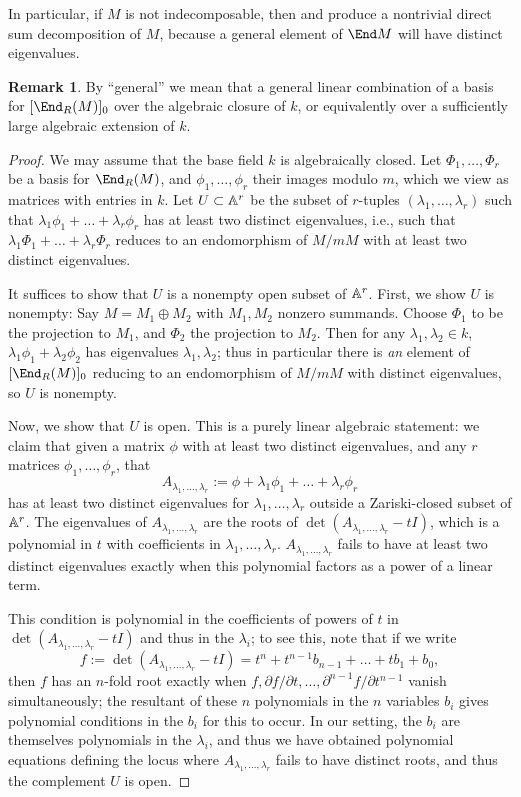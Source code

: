 \documentclass[12pt]{article}
\let\l\lambda
\let\d\partial
\theoremstyle{theorem}
\numberwithin{thm}{section}
\theoremstyle{definition}
\newtheorem{rem}[thm]{Remark}
\begin{document}
In particular, if $M$ is not indecomposable, then  and  produce a nontrivial direct sum decomposition of $M$, because a general element of $\End M$ will have distinct eigenvalues.

\begin{rem}
  By ``general'' we mean that a general linear combination of a basis for $[\End_R(M)]_0$ over the algebraic closure of $k$, or equivalently over a sufficiently large algebraic extension of $k$.
\end{rem}

\begin{proof}
  We may assume that the base field $k$ is algebraically closed.
  Let $\Phi_1,\dots,\Phi_r$ be a basis for $\End_R(M)$, and $\phi_1,\dots,\phi_r$ their images modulo $m$, which we view as matrices with entries in $k$.
  Let $U\subset \mathbb A^r$ be the subset of $r$-tuples $(\l_1,\dots,\l_r)$ such that $\l_1\phi_1+\dots+\l_r\phi_r$ has at least two distinct eigenvalues, i.e., such that $\l_1\Phi_1+\dots+\l_r\Phi_r$ reduces to an endomorphism of $M/mM$ with at least two distinct eigenvalues.

  It suffices to show that $U$ is a nonempty open subset of $\mathbb A^r$. First, we show $U$ is nonempty:
  Say $M=M_1\oplus M_2$ with $M_1,M_2$  nonzero  summands. Choose $\Phi_1$ to be the projection to $M_1$, and $\Phi_2$ the projection to $M_2$. Then for any $\l_1,\l_2\in k$, $\l_1\phi_1 + \l_2\phi_2$ has eigenvalues $\l_1,\l_2$; thus in particular there is \emph{an} element of $[\End_R(M)]_0$ reducing to an endomorphism of $M/mM$ with distinct eigenvalues, so $U$ is nonempty.

  Now, we show that $U$ is open. This is a purely linear algebraic statement: we claim that given a matrix $\phi$ with at least two distinct eigenvalues, and any $r$ matrices $\phi_1,\dots,\phi_r$, that
  $$ A_{\l_1,\dots,\l_r}:=\phi+\l_1\phi_1+\dots+\l_r\phi_r $$
  has at least two distinct eigenvalues for $\l_1,\dots,\l_r$ outside a Zariski-closed subset of $\mathbb A^r$.
  The eigenvalues of $A_{\l_1,\dots,\l_r}$ are the roots of $\det(A_{\l_1,\dots,\l_r}-t I)$, which is a polynomial in $t$ with coefficients in $\l_1,\dots,\l_r$.
$A_{\l_1,\dots,\l_r}$ fails to have at least two distinct eigenvalues exactly when this polynomial factors as a power of a linear term.

This condition is polynomial in the coefficients of powers of $t$ in $\det(A_{\l_1,\dots,\l_r}-t I)$ and thus in the $\l_i$; to see this, note that
if we write
  $$ f:=\det(A_{\l_1,\dots,\l_r}-t I)=t^n  +t^{n-1}b_{n-1}+\dots +t b_1 +b_0, $$
then $f$
  has an $n$-fold root exactly when
  $ f,\d f/\d t,\dots, \d^{n-1} f/\d t^{n-1} $
  vanish simultaneously; the resultant of these $n$ polynomials in the $n$ variables $b_i$ gives polynomial conditions in the $b_i$ for this to occur.
 In our setting, the $b_i$ are themselves polynomials in the $\l_i$, and thus we have obtained polynomial equations defining the locus where $A_{\l_1,\dots,\l_r}$ fails to have distinct roots, and thus the complement $U$ is open.
\end{proof}
\end{document}
